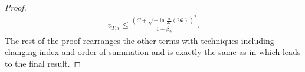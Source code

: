 \documentclass[letterpaper]{article} %
\begin{document}
\begin{proof}
\begin{gather*}
        v_{T,i} \leq \frac{(C + \sqrt{-\ln{\frac{\alpha}{2T}}(2\Phi)})^2}{1-\beta_2}.
    \end{gather*}
    The rest of the proof rearranges the other terms with techniques including changing index and order of summation and is exactly the same as in \citep{défossez2022simple} which leads to the final result.
\end{proof}
\end{document}
